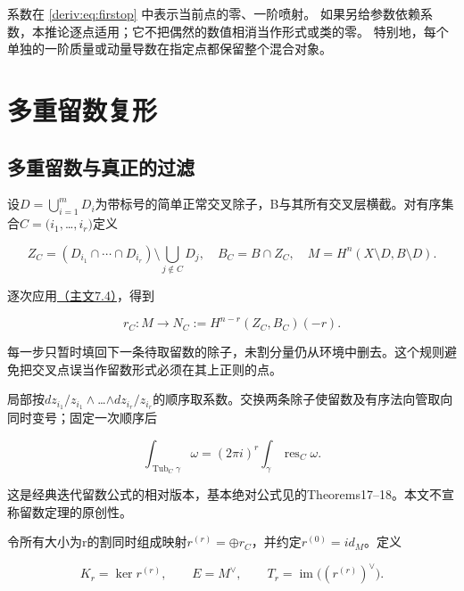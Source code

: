 \documentclass[11pt,a4paper,oneside]{ctexart}
\theoremstyle{cnplain}
\theoremstyle{definition}
\theoremstyle{remark}
\numberwithin{equation}{section}
\newcommand{\otherref}[2]{\href{#1.pdf}{#2}}
\begin{document}
系数在 \eqref{deriv:eq:firstop} 中表示当前点的零、一阶喷射。
如果另给参数依赖系数，本推论逐点适用；它不把偶然的数值相消当作形式或类的零。
特别地，每个单独的一阶质量或动量导数在指定点都保留整个混合对象。


\endgroup

\section{多重留数复形}\label{supp:cut}

\begingroup

\subsection{多重留数与真正的过滤}\label{sec:cut:3}

设\(D=\bigcup _{i=1}^m D_i\)为带标号的简单正常交叉除子，B与其所有交叉层横截。对有序集合\(C=(i_{1},\)\ldots{}\(,i_r)\)定义

\begin{equation}
Z_C=(D_{i_1}\cap\cdots\cap D_{i_r})
                         \setminus\bigcup_{j\notin C}D_j,
 \quad B_C=B\cap Z_C,
 \quad M=H^n(X\setminus D,B\setminus D).
\end{equation}

逐次应用\otherref{feynman_periods_long_paper}{（主文7.4）}，得到

\begin{equation}
r_C:M\longrightarrow N_C:=H^{n-r}(Z_C,B_C)(-r).       \label{eq:cut:3.1}
\end{equation}

每一步只暂时填回下一条待取留数的除子，未割分量仍从环境中删去。这个规则避免把交叉点误当作留数形式必须在其上正则的点。

局部按\(dz_{i_{1}}/z_{i_{1}}\wedge \)\ldots{}\(\wedge dz_{i_r}/z_{i_r}\)的顺序取系数。交换两条除子使留数及有序法向管取向同时变号；固定一次顺序后

\begin{equation}
\int_{\operatorname{Tub}_C\gamma}\omega
       =(2\pi i)^r\int_\gamma\operatorname{res}_C\omega.\label{eq:cut:3.2}
\end{equation}

这是经典迭代留数公式的相对版本，基本绝对公式见\cite{muhlbauer}的Theorems17--18。本文不宣称留数定理的原创性。

令所有大小为r的割同时组成映射\(r^{(r)}=\oplus r_C\)，并约定\(r^{(0)}=id_M\)。定义

\begin{equation}
K_r=\ker r^{(r)},\qquad E=M^\vee,\qquad
 T_r=\operatorname{im}\bigl((r^{(r)})^\vee\bigr).
                                                               \label{eq:cut:3.3}
\end{equation}
\end{document}
